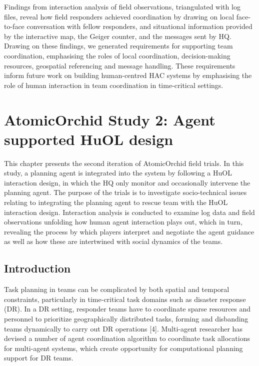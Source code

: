 Findings from interaction analysis of field observations, triangulated with log files, reveal how field responders achieved coordination by drawing on local face-to-face conversation with fellow responders, and situational information provided by the interactive map, the Geiger counter, and the messages sent by HQ. Drawing on these findings, we generated requirements for supporting team coordination, emphasising the roles of local coordination, decision-making resources, geospatial referencing and message handling. These requirements inform future work on building human-centred HAC systems by emphasising the role of human interaction in team coordination in time-critical settings.\\

\chapter{AtomicOrchid Study 2: Agent supported HuOL design}\label{ch:studytwo} %
This chapter presents the second iteration of AtomicOrchid field trials. In this study, a planning agent is integrated into the system by following a HuOL interaction design, in which the HQ only monitor and occasionally intervene the planning agent. The purpose of the trials is to investigate socio-technical issues relating to integrating the planning agent to rescue team with the HuOL interaction design. Interaction analysis is conducted to examine log data and field observations unfolding how human agent interaction plays out, which in turn, revealing the process by which players interpret and negotiate the agent guidance as well as how these are intertwined with social dynamics of the teams.

\section{Introduction}\label{sec:studytwointroduction}
Task planning in teams can be complicated by both spatial and temporal constraints, particularly in time-critical task domains such as disaster response (DR). In a DR setting, responder teams have to coordinate sparse resources and personnel to prioritize geographically distributed tasks, forming and disbanding teams dynamically to carry out DR operations [4]. Multi-agent researcher has devised a number of agent coordination algorithm to coordinate task allocations for multi-agent systems, which create opportunity for computational planning support for DR teams. \\

